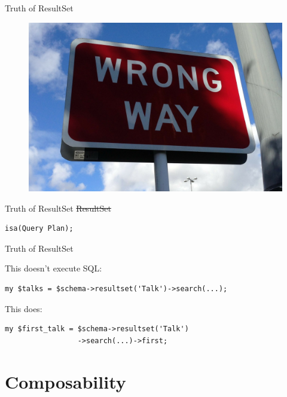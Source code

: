 
\begin{frame}{Truth of ResultSet}
\begin{figure}[!ht]
\centering
\includegraphics[width=1\linewidth]{img/wrong-way.jpg}
\end{figure}
\end{frame}

\begin{frame}[fragile]{Truth of ResultSet}
\sout{ResultSet}

\begin{lstlisting}
isa(Query Plan);
\end{lstlisting}

\end{frame}

\begin{frame}[fragile]{Truth of ResultSet}

This doesn't execute SQL:

\begin{lstlisting}
my $talks = $schema->resultset('Talk')->search(...);
\end{lstlisting}

This does:

\begin{lstlisting}
my $first_talk = $schema->resultset('Talk')
                 ->search(...)->first;
\end{lstlisting}

\end{frame}

\section{Composability}

